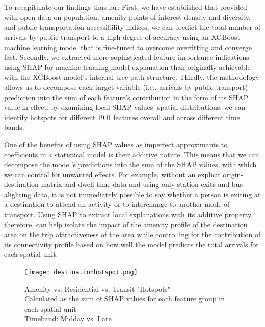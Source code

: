 \section*{}
To recapitulate our findings thus far: First, we have established that provided with open data on population, amenity points-of-interest density and diversity, and public transportation accessibility indices, we can predict the total number of arrivals by public transport to a high degree of accuracy using an XGBoost machine learning model that is fine-tuned to overcome overfitting and converge fast. Secondly, we extracted more sophisticated feature importance indications using SHAP for machine learning model explanation than originally achievable with the XGBoost model's internal tree-path structure. Thirdly, the methodology allows us to decompose each target variable (i.e., arrivals by public transport) prediction into the sum of each feature's contribution in the form of its SHAP value.in effect, by examining local SHAP values' spatial distributions, we can identify hotspots for different POI features overall and across different time bands.

One of the benefits of using SHAP values as imperfect approximants to coefficients in a statistical model is their additive nature. This means that we can decompose the model's predictions into the sum of the SHAP values, with which we can control for unwanted effects. For example, without an explicit origin-destination matrix and dwell time data and using only station exits and bus alighting data, it is not immediately possible to say whether a person is exiting at a destination to attend an activity or to interchange to another mode of transport. Using SHAP to extract local explanations with its additive property, therefore, can help isolate the impact of the amenity profile of the destination area on the trip attractiveness of the area while controlling for the contribution of its connectivity profile based on how well the model predicts the total arrivals for each spatial unit.

\begin{figure}[!htb]
    \centering
    \texttt{[image: destinationhotspot.png]}
    \captionsetup{justification=centering}
    \caption{Amenity vs. Residential vs. Transit "Hotspots" \\Calculated as the sum of SHAP values for each feature group in each spatial unit\\Timeband: Midday vs. Late}
    \label{fig:destinationhotspot}
\end{figure}


